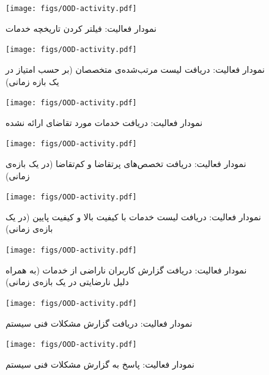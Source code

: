 \begin{figure}
	\centering
	\texttt{[image: figs/OOD-activity.pdf]}
	\caption{نمودار فعالیت: فیلتر کردن تاریخچه خدمات}
\end{figure}
\FloatBarrier
\newpage

\begin{figure}
	\centering
	\texttt{[image: figs/OOD-activity.pdf]}
	\caption{نمودار فعالیت: دریافت لیست مرتب‌شده‌ی متخصصان (بر حسب امتیاز در یک بازه زمانی)}
\end{figure}
\FloatBarrier
\newpage

\begin{figure}
	\centering
	\texttt{[image: figs/OOD-activity.pdf]}
	\caption{نمودار فعالیت: ‌دریافت خدمات مورد تقاضای ارائه نشده}
\end{figure}
\FloatBarrier
\newpage

\begin{figure}
	\centering
	\texttt{[image: figs/OOD-activity.pdf]}
	\caption{نمودار فعالیت: دریافت تخصص‌های پرتقاضا و کم‌تقاضا (در یک بازه‌ی زمانی)}
\end{figure}
\FloatBarrier
\newpage

\begin{figure}
	\centering
	\texttt{[image: figs/OOD-activity.pdf]}
	\caption{نمودار فعالیت: دریافت لیست خدمات با کیفیت بالا و کیفیت پایین (در یک بازه‌ی زمانی)}
\end{figure}
\FloatBarrier
\newpage

\begin{figure}
	\centering
	\texttt{[image: figs/OOD-activity.pdf]}
	\caption{نمودار فعالیت: دریافت گزارش کاربران ناراضی از خدمات (به همراه دلیل نارضایتی  در یک بازه‌ی زمانی)}
\end{figure}
\FloatBarrier
\newpage

\begin{figure}
	\centering
	\texttt{[image: figs/OOD-activity.pdf]}
	\caption{نمودار فعالیت: دریافت گزارش مشکلات فنی سیستم}
\end{figure}
\FloatBarrier
\newpage

\begin{figure}
	\centering
	\texttt{[image: figs/OOD-activity.pdf]}
	\caption{نمودار فعالیت: پاسخ به گزارش مشکلات فنی سیستم}
\end{figure}
\FloatBarrier
\newpage
